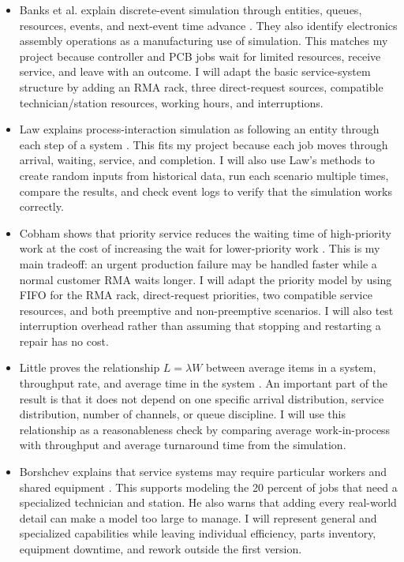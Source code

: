 \documentclass[12pt, letterpaper, twoside]{article}
\begin{document}
\begin{itemize}
    \item Banks et al. explain discrete-event simulation through entities, queues, resources,
    events, and next-event time advance \cite{banks2005}. They also identify electronics
    assembly operations as a manufacturing use of simulation. This matches my project
    because controller and PCB jobs wait for limited resources, receive service, and leave
    with an outcome. I will adapt the basic service-system structure by adding an RMA rack,
    three direct-request sources, compatible technician/station resources, working hours,
    and interruptions.

    \item Law explains process-interaction simulation as following an entity through each step of a system \cite{law2015}. 
    This fits my project because each job moves through arrival, waiting, service, and completion. 
    I will also use Law's methods to create random inputs from historical data, run each scenario multiple times, 
    compare the results, and check event logs to verify that the simulation works correctly.

    \item Cobham shows that priority service reduces the waiting time of high-priority work
    at the cost of increasing the wait for lower-priority work \cite{cobham1954}. This is
    my main tradeoff: an urgent production failure may be handled faster
    while a normal customer RMA waits longer. I will adapt the priority model by using FIFO
    for the RMA rack, direct-request priorities, two compatible service resources, and both
    preemptive and non-preemptive scenarios. I will also test interruption overhead rather
    than assuming that stopping and restarting a repair has no cost.

    \item Little proves the relationship $L = \lambda W$ between average items in a system,
    throughput rate, and average time in the system \cite{little1961}. An important part of
    the result is that it does not depend on one specific arrival distribution, service
    distribution, number of channels, or queue discipline. I will use this relationship as
    a reasonableness check by comparing average work-in-process with throughput and average
    turnaround time from the simulation.

    \item Borshchev explains that service systems may require particular workers and shared
    equipment \cite{borshchev2020}. This supports modeling the 20 percent of jobs that need
    a specialized technician and station. He also warns that adding every real-world detail
    can make a model too large to manage. I will represent general and specialized
    capabilities while leaving individual efficiency, parts inventory, equipment downtime,
    and rework outside the first version.

\end{itemize}
\end{document}
